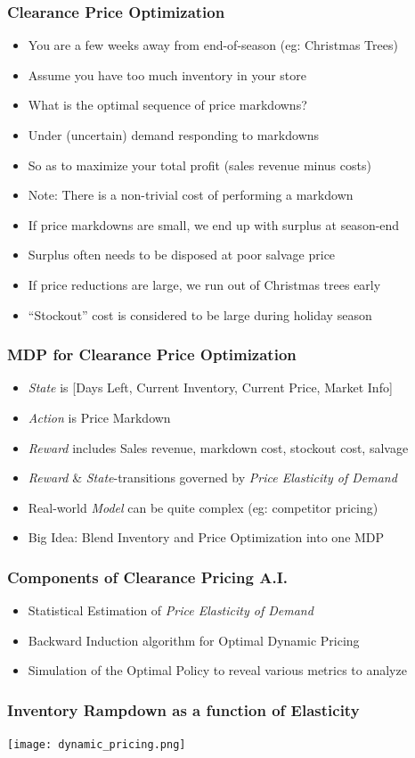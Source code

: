 \documentclass[handout]{beamer}
\begin{document}
\begin{frame}
\frametitle{Clearance Price Optimization}
\pause
\begin{itemize}[<+->]
\item You are a few weeks away from end-of-season (eg: Christmas Trees)
\item Assume you have too much inventory in your store
\item What is the optimal sequence of price markdowns?
\item Under (uncertain) demand responding to markdowns
\item So as to maximize your total profit (sales revenue minus costs)
\item Note: There is a non-trivial cost of performing a markdown
\item If price markdowns are small, we end up with surplus at season-end
\item Surplus often needs to be disposed at poor salvage price
\item If price reductions are large, we run out of Christmas trees early
\item ``Stockout'' cost is considered to be large during holiday season
\end{itemize}
\end{frame}

\begin{frame}
\frametitle{MDP for Clearance Price Optimization}
\pause
\begin{itemize}[<+->]
\item {\em State} is [Days Left, Current Inventory, Current Price, Market Info]
\item {\em Action} is Price Markdown
\item {\em Reward} includes Sales revenue, markdown cost, stockout cost, salvage
\item {\em Reward} \& {\em State}-transitions governed by {\em Price Elasticity of Demand}
\item Real-world {\em Model} can be quite complex (eg: competitor pricing)
\item Big Idea: Blend Inventory and Price Optimization into one MDP
\end{itemize}
\end{frame}

\begin{frame}
\frametitle{Components of Clearance Pricing A.I.}
\pause
\begin{itemize}[<+->]
\item Statistical Estimation of {\em Price Elasticity of Demand}
\item Backward Induction algorithm for Optimal Dynamic Pricing
\item Simulation of the Optimal Policy to reveal various metrics to analyze
\end{itemize}
\end{frame}

\begin{frame}
\frametitle{Inventory Rampdown as a function of Elasticity}
\texttt{[image: dynamic\_pricing.png]}
\end{frame}
\end{document}
